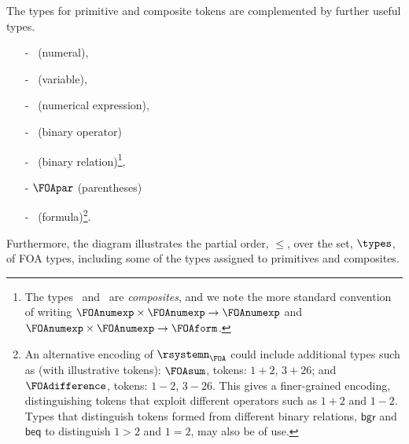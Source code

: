 \documentclass[a4paper]{article}
\theoremstyle{definition}
\begin{document}
		The types for primitive and composite tokens are complemented by further useful types.
		\begin{center}
		\begin{multicols}{2}%
			\begin{itemize}[itemsep=2pt]
				\item[-] \FOAnum\ (numeral),
				\item[-] \FOAvar\ (variable),
				\item[-] \FOAnumexp\ (numerical expression),
				\item[-]  \FOAbop\ (binary operator)
				\item[-] \FOAbrel\ (binary relation)\footnote{The types \FOAbop\ and \FOAbrel\ are \textit{composites}, and we note the more standard convention of writing $\FOAnumexp\times \FOAnumexp \to \FOAnumexp$ and $\FOAnumexp\times \FOAnumexp \to \FOAform$.},
				\item[-] $\FOApar$ (parentheses)
				\item[-] \FOAform\ (formula)\footnote{An alternative encoding of $\rsystemn_{\FOA}$ could include additional types such as (with illustrative tokens): $\FOAsum$, tokens: $1+2$, $3+26$; and $\FOAdifference$, tokens: $1-2$, $3-26$. This gives a finer-grained encoding, distinguishing tokens that exploit different operators such as $1+2$ and $1-2$. Types that distinguish tokens formed from different binary relations, $\textsf{bgr}$ and $\textsf{beq}$ to distinguish $1>2$ and $1=2$, may also be of use.}.
				\item[]
			\end{itemize}
		\end{multicols}
	\end{center}
		Furthermore, the diagram illustrates the partial order, $\leq$, over the set, $\types$, of FOA types, including some of the types assigned to primitives and composites.
\end{document}
